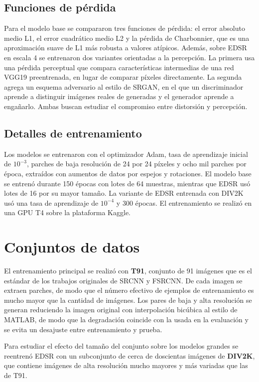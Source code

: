 \documentclass[conference]{IEEEtran}
\begin{document}
\subsection{Funciones de pérdida}
Para el modelo base se compararon tres funciones de pérdida: el error absoluto medio L1, el error
cuadrático medio L2 y la pérdida de Charbonnier, que es una aproximación suave de L1 más robusta a
valores atípicos. Además, sobre EDSR en escala 4 se entrenaron dos variantes orientadas a la
percepción. La primera usa una pérdida perceptual que compara características intermedias de una
red VGG19 preentrenada, en lugar de comparar píxeles directamente. La segunda agrega un esquema
adversario al estilo de SRGAN, en el que un discriminador aprende a distinguir imágenes reales de
generadas y el generador aprende a engañarlo. Ambas buscan estudiar el compromiso entre distorsión
y percepción.

\subsection{Detalles de entrenamiento}
Los modelos se entrenaron con el optimizador Adam, tasa de aprendizaje inicial de $10^{-3}$,
parches de baja resolución de 24 por 24 píxeles y ocho mil parches por época, extraídos con
aumentos de datos por espejos y rotaciones. El modelo base se entrenó durante 150 épocas con lotes
de 64 muestras, mientras que EDSR usó lotes de 16 por su mayor tamaño. La variante de EDSR
entrenada con DIV2K usó una tasa de aprendizaje de $10^{-4}$ y 300 épocas. El entrenamiento se
realizó en una GPU T4 sobre la plataforma Kaggle.

\section{Conjuntos de datos}
El entrenamiento principal se realizó con \textbf{T91}, conjunto de 91 imágenes que es el estándar
de los trabajos originales de SRCNN y FSRCNN. De cada imagen se extraen parches, de modo que el
número efectivo de ejemplos de entrenamiento es mucho mayor que la cantidad de imágenes. Los pares
de baja y alta resolución se generan reduciendo la imagen original con interpolación bicúbica al
estilo de MATLAB, de modo que la degradación coincide con la usada en la evaluación y se evita un
desajuste entre entrenamiento y prueba.

Para estudiar el efecto del tamaño del conjunto sobre los modelos grandes se reentrenó EDSR con un
subconjunto de cerca de doscientas imágenes de \textbf{DIV2K}, que contiene imágenes de alta
resolución mucho mayores y más variadas que las de T91.
\end{document}
